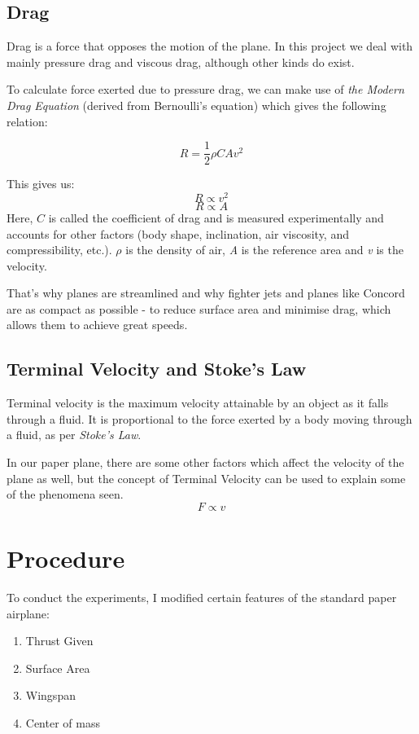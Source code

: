\documentclass[12pt]{article}
\begin{document}
\subsection{Drag}
Drag is a force that opposes the motion of the plane. In this project we deal with mainly pressure drag and viscous drag, although other kinds do exist.

To calculate force exerted due to pressure drag, we can make use of \emph{the Modern Drag Equation} (derived from Bernoulli's equation) which gives the following relation:

\begin{equation}\label{eq:drag equation}
R = \frac{1}{2} \rho C A v^{2} 
\end{equation}

This gives us:
\begin{equation}
R \propto v^{2}
\end{equation}
\begin{equation} 
R \propto A
\end{equation}
Here, $C$ is called the coefficient of drag and is measured experimentally and accounts for other factors (body shape, inclination, air viscosity, and compressibility, etc.). $\rho$ is the density of air, \emph{A} is the reference area and \emph{v} is the velocity.

That's why planes are streamlined and why fighter jets and planes like Concord are as compact as possible - to reduce surface area and minimise drag, which allows them to achieve great speeds.
\subsection{Terminal Velocity and Stoke's Law}
Terminal velocity is the maximum velocity attainable by an object as it falls through a fluid. It is proportional to the force exerted by a body moving through a fluid, as per \emph{Stoke's Law}.

In our paper plane, there are some other factors which affect the velocity of the plane as well, but
the concept of Terminal Velocity can be used to explain some of the phenomena seen.
\begin{equation}\label{eq:Stoke's Law}
F \propto v
\end{equation}
\section{Procedure}
To conduct the experiments, I modified certain features of the standard paper airplane:
\begin{enumerate}
\item Thrust Given
\item Surface Area
\item Wingspan
\item Center of mass
\end{enumerate}
\end{document}
